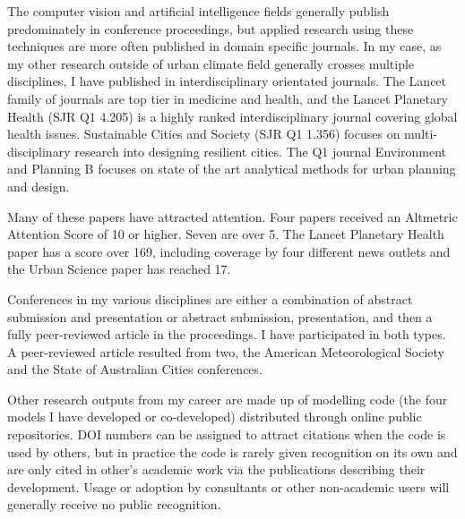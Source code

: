 The computer vision and artificial intelligence fields generally publish predominately in conference proceedings, but applied research using these techniques are more often published in domain specific journals. In my case, as my other research outside of urban climate field generally crosses multiple disciplines, I have published in interdisciplinary orientated journals. The Lancet family of journals are top tier in medicine and health, and the Lancet Planetary Health (SJR Q1 4.205) is a highly ranked interdisciplinary journal covering global health issues. Sustainable Cities and Society (SJR Q1 1.356) focuses on multi-disciplinary research into designing resilient cities. The Q1 journal Environment and Planning B focuses on state of the art analytical methods for urban planning and design.

Many of these papers have attracted attention. Four papers received an Altmetric Attention Score of 10 or higher. Seven are over 5. The Lancet Planetary Health paper has a score over 169, including coverage by four different news outlets and the Urban Science paper has reached 17.

Conferences in my various disciplines are either a combination of abstract submission and presentation or abstract submission, presentation, and then a fully peer-reviewed article in the proceedings. I have participated in both types. A peer-reviewed article resulted from two, the American Meteorological Society and the State of Australian Cities conferences.

Other research outputs from my career are made up of modelling code (the four models I have developed or co-developed) distributed through online public repositories. DOI numbers can be assigned to attract citations when the code is used by others, but in practice the code is rarely given recognition on its own and are only cited in other's academic work via the publications describing their development. Usage or adoption by consultants or other non-academic users will generally receive no public recognition.















%
